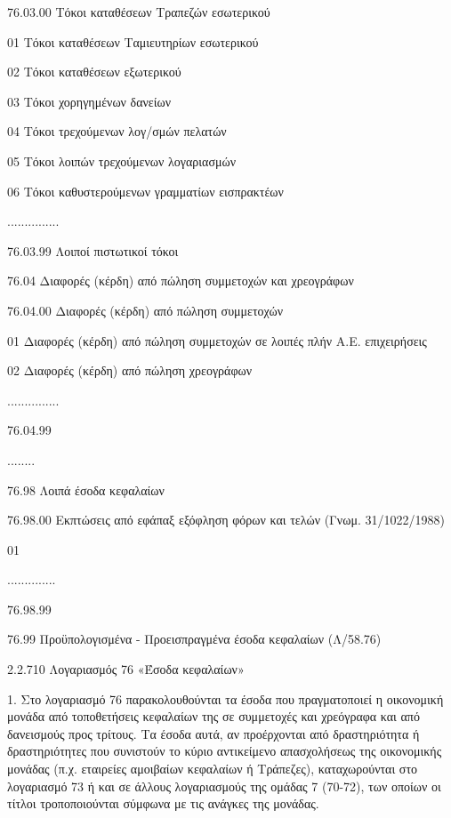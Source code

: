\documentclass[A4,10pt,greek]{book}
\begin{document}
                     76.03.00    Τόκοι καταθέσεων Τραπεζών εσωτερικού 

                               01    Τόκοι καταθέσεων Ταμιευτηρίων εσωτερικού 

                               02    Τόκοι καταθέσεων εξωτερικού 

                               03    Τόκοι χορηγημένων δανείων 

                               04    Τόκοι τρεχούμενων λογ/σμών πελατών 

                               05    Τόκοι λοιπών τρεχούμενων λογαριασμών 

                               06    Τόκοι καθυστερούμενων γραμματίων εισπρακτέων 

                     ...............

                     76.03.99    Λοιποί πιστωτικοί τόκοι

        76.04    Διαφορές (κέρδη) από πώληση συμμετοχών και χρεογράφων 

                     76.04.00    Διαφορές (κέρδη) από πώληση συμμετοχών 

                               01    Διαφορές (κέρδη) από πώληση συμμετοχών σε λοιπές
                                       πλήν Α.Ε. επιχειρήσεις 

                               02    Διαφορές (κέρδη) από πώληση χρεογράφων 

                     ...............

                     76.04.99

        ........

        76.98    Λοιπά έσοδα κεφαλαίων

                     76.98.00    Εκπτώσεις από εφάπαξ εξόφληση φόρων και τελών
                                       (Γνωμ. 31/1022/1988)

                               01

                     ..............

                     76.98.99

        76.99    Προϋπολογισμένα - Προεισπραγμένα έσοδα κεφαλαίων (Λ/58.76)

2.2.710 Λογαριασμός 76 «Έσοδα κεφαλαίων»

1. Στο λογαριασμό 76 παρακολουθούνται τα έσοδα που πραγματοποιεί η οικονομική μονάδα από τοποθετήσεις κεφαλαίων της σε συμμετοχές και χρεόγραφα και από δανεισμούς προς τρίτους. Τα έσοδα αυτά, αν προέρχονται από δραστηριότητα ή δραστηριότητες που συνιστούν το κύριο αντικείμενο απασχολήσεως της οικονομικής μονάδας (π.χ. εταιρείες αμοιβαίων κεφαλαίων ή Τράπεζες), καταχωρούνται στο λογαριασμό 73 ή και σε άλλους λογαριασμούς της ομάδας 7 (70-72), των οποίων οι τίτλοι τροποποιούνται σύμφωνα με τις ανάγκες της μονάδας.
\end{document}
